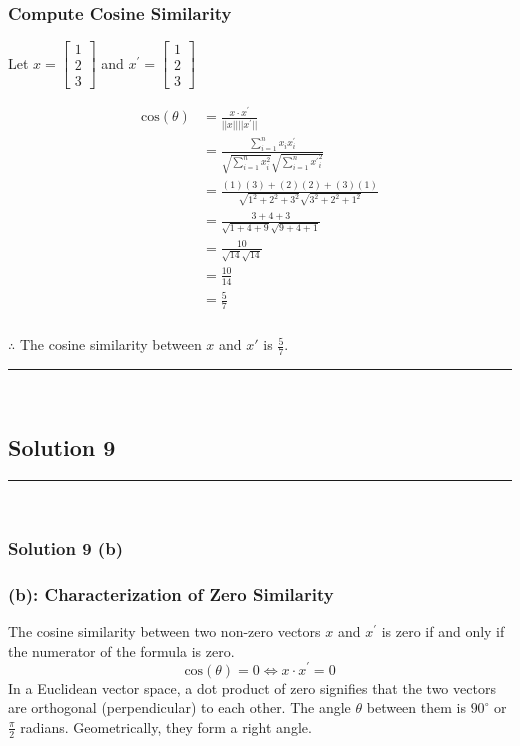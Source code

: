 \documentclass{article}
\begin{document}
\subsubsection*{Compute Cosine Similarity}
\parbox{\textwidth}{
  Let $x=\begin{bmatrix} 1 \\ 2 \\ 3 \end{bmatrix}$ and $x^{\prime}=\begin{bmatrix} 1 \\ 2 \\ 3 \end{bmatrix}$

}
\begin{align*}
    \text{cos}(\theta) &= \frac{x \cdot x^{\prime}}{||x|| ||x^{\prime}||} \\
    &= \frac{\sum_{i=1}^{n}x_{i}x^{\prime}_{i}}{\sqrt{\sum_{i=1}^{n}x_{i}^2}\sqrt{\sum_{i=1}^{n}{x^{\prime}}_{i}^2}} \\
    &= \frac{(1)(3) + (2)(2) + (3)(1)}{\sqrt{1^2+2^2+3^2} \sqrt{3^2+2^2+1^2}} \\
    &= \frac{3 + 4 + 3}{\sqrt{1+4+9} \sqrt{9+4+1}} \\
    &= \frac{10}{\sqrt{14} \sqrt{14}} \\
    &= \frac{10}{14} \\
    &= \frac{5}{7}
\end{align*}
\subsubsection*{\normalfont}{$\therefore$ The cosine similarity between $x$ and $x'$ is $\frac{5}{7}$.}


\noindent\rule{\textwidth}{0.4pt}\\

\newpage

\subsection*{Solution 9}
\noindent\rule{\textwidth}{0.4pt}\\
\subsubsection*{Solution 9 (b)}
\subsubsection*{(b): Characterization of Zero Similarity}
\parbox{\textwidth}{
The cosine similarity between two non-zero vectors $x$ and $x^{\prime}$ is zero if and only if the numerator of the formula is zero.
$$ \text{cos}(\theta) = 0 \iff x \cdot x^{\prime} = 0 $$
In a Euclidean vector space, a dot product of zero signifies that the two vectors are orthogonal (perpendicular) to each other. The angle $\theta$ between them is $90^\circ$ or $\frac{\pi}{2}$ radians. Geometrically, they form a right angle.
}
\end{document}
